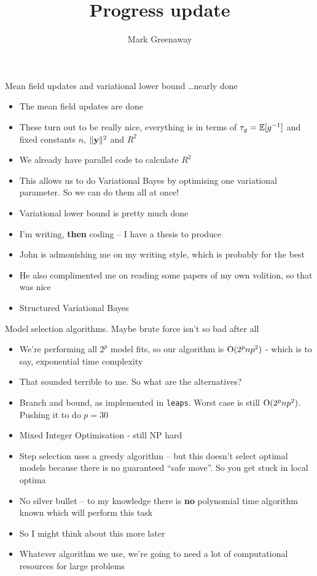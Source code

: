 \documentclass{beamer}
\title{Progress update}
\author{Mark Greenaway}
\begin{document}
\begin{frame}
\titlepage
\end{frame}

\begin{frame}{Mean field updates and variational lower bound \ldots nearly done}
\begin{itemize}
\item The mean field updates are done
\item These turn out to be really nice, everything is in terms of $\tau_g = \mathbb{E} [g^{-1}]$
			and fixed constants $n$, $\|{\bf y}\|^2$ and $R^2$
\item We already have parallel code	to calculate $R^2$
\item This allows us to do Variational Bayes by optimising one variational parameter. So we can do them all 
			at once!
\item Variational lower bound is pretty much done
\item I'm writing, \textbf{then} coding -- I have a thesis to produce
\item John is admonishing me on my writing style, which is probably for the best
\item He also complimented me on reading some papers of my own volition, so that was nice
\item Structured Variational Bayes
\end{itemize}
\end{frame}

\begin{frame}{Model selection algorithms. Maybe brute force isn't so bad after all}
\begin{itemize}
\item We're performing all $2^p$ model fits, so our algorithm is $\text{O}(2^p n p^2)$ - which is to say,
			exponential time complexity
\item That sounded terrible to me. So what are the alternatives?
\item Branch and bound, as implemented in \texttt{leaps}. Worst case is still $\text{O}(2^p n p^2)$. Pushing it
			to do $p = 30$
\item Mixed Integer Optimisation - still NP hard
\item Step selection uses a greedy algorithm -- but this doesn't select optimal models because there is no
			guaranteed ``safe move''. So you get stuck in local optima
\item No silver bullet -- to my knowledge there is \textbf{no} polynomial time algorithm known which
			will perform this task
\item So I might think about this more later
\item Whatever algorithm we use, we're going to need a lot of computational resources for large problems
\end{itemize}
\end{frame}
\end{document}
